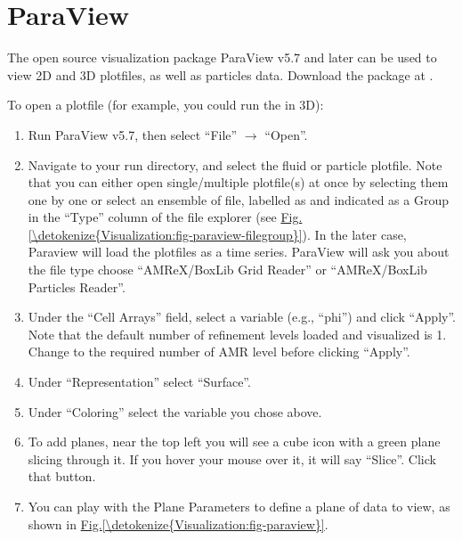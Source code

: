 \documentclass[letterpaper,10pt,english]{sphinxmanual}
\begin{document}
\section{ParaView}
\label{\detokenize{Visualization:paraview}}\label{\detokenize{Visualization:section-1}}
\sphinxAtStartPar
The open source visualization package ParaView v5.7 and later can be used to view 2D and 3D
plotfiles, as well as particles data. Download the package at
.

\sphinxAtStartPar
To open a plotfile (for example, you could run the
 in 3D):
\begin{enumerate}
%
\item {} 
\sphinxAtStartPar
Run ParaView v5.7, then select “File” \(\rightarrow\) “Open”.

\item {} 
\sphinxAtStartPar
Navigate to your run directory, and select the fluid or particle plotfile.
Note that you can either open single/multiple plotfile(s) at once by selecting
them one by one or select an ensemble of file, labelled as  and indicated
as a Group in the “Type” column of the file explorer (see \hyperref[\detokenize{Visualization:fig-paraview-filegroup}]{Fig.\@ \ref{\detokenize{Visualization:fig-paraview-filegroup}}}).
In the later case, Paraview will load the plotfiles as a time series.
ParaView will ask you about the file type \textendash{} choose “AMReX/BoxLib Grid Reader” or
“AMReX/BoxLib Particles Reader”.

\item {} 
\sphinxAtStartPar
Under the “Cell Arrays” field, select a variable (e.g., “phi”) and click
“Apply”. Note that the default number of refinement levels loaded and visualized is 1.
Change to the required number of AMR level before clicking “Apply”.

\item {} 
\sphinxAtStartPar
Under “Representation” select “Surface”.

\item {} 
\sphinxAtStartPar
Under “Coloring” select the variable you chose above.

\item {} 
\sphinxAtStartPar
To add planes, near the top left you will see a cube icon with a green plane
slicing through it. If you hover your mouse over it, it will say “Slice”.
Click that button.

\item {} 
\sphinxAtStartPar
You can play with the Plane Parameters to define a plane of data to view, as
shown in \hyperref[\detokenize{Visualization:fig-paraview}]{Fig.\@ \ref{\detokenize{Visualization:fig-paraview}}}.

\end{enumerate}
\end{document}
